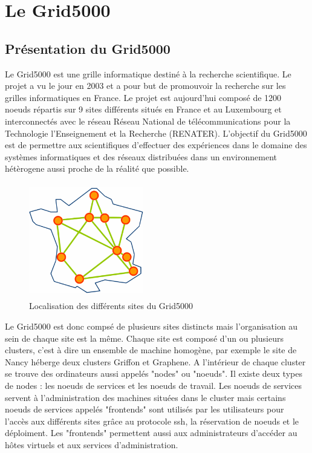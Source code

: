 \documentclass [10pt,a4paper]{report}
\begin{document}
\part{Le Grid5000}
	\chapter{Présentation du Grid5000}
Le Grid5000 est une grille informatique destiné à la recherche scientifique. Le projet a vu le jour en 2003 et a pour but de promouvoir la recherche sur les grilles informatiques en France. Le projet est aujourd'hui composé de 1200 noeuds répartis sur 9 sites différents situés en France et au Luxembourg et interconnectés avec le réseau Réseau National de télécommunications pour la Technologie l'Enseignement et la Recherche (RENATER). L'objectif du Grid5000 est de permettre aux scientifiques d'effectuer des expériences dans le domaine des systèmes informatiques et des réseaux distribuées dans un environnement hétèrogene aussi proche de la réalité que possible.

	\begin{figure}[!h]
		\centering
   		\includegraphics[width=5cm,height=5cm]{map.png}
   		\caption{Localisation des différents sites du Grid5000}
    	\label{fig:map}
	\end{figure} 

Le Grid5000 est donc compsé de plusieurs sites distincts mais l'organisation au sein de chaque site est la même. Chaque site est composé d'un ou plusieurs clusters, c'est à dire un ensemble de machine homogène, par exemple le site de Nancy héberge deux clusters Griffon et Graphene. A l'intérieur de chaque cluster se trouve des ordinateurs aussi appelés "nodes" ou "noeuds". Il existe deux types de nodes : les noeuds de services et les noeuds de travail. Les noeuds de services servent à l'administration des machines situées dans le cluster mais certains noeuds de services appelés "frontends" sont utilisés par les utilisateurs pour l'accès aux différents sites grâce au protocole ssh, la réservation de noeuds et le déploiment. Les "frontends" permettent aussi aux administrateurs d'accéder au hôtes virtuels et aux services d'administration.
\end{document}
